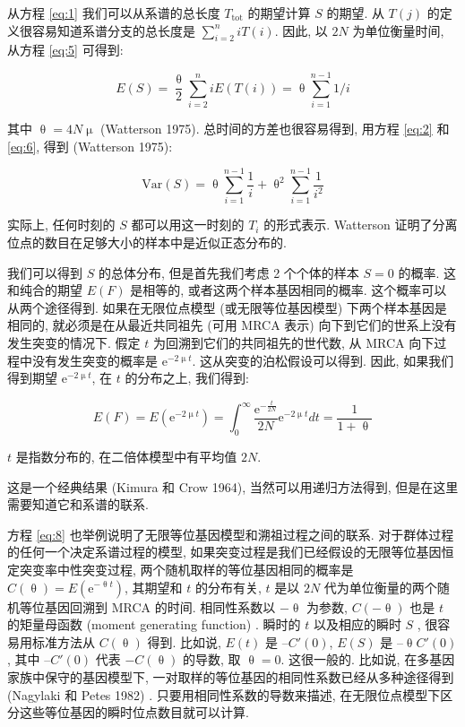 \documentclass[
    12pt,%
    ]{article}
\begin{document}
从方程 \ref{eq:1} 我们可以从系谱的总长度 $T_{\text{tot}}$ 的期望计算 $S$ 的期望. 从 $T(j)$
的定义很容易知道系谱分支的总长度是 $\sum_{i=2}^{n} i T(i)$. 因此, 以 $2N$ 为单位衡量时间, 从方程
\ref{eq:5} 可得到:

\begin{equation} \label{eq:6}
    E(S)=\frac{\uptheta}{2} \sum_{i=2}^{n} iE(T(i)) = \uptheta \sum_{i=1}^{n-1}1/i
\end{equation}

其中 $\uptheta = 4N \upmu$ (Watterson 1975). 总时间的方差也很容易得到, 用方程 \ref{eq:2} 和 \ref{eq:6}, 得到
(Watterson 1975):

\begin{equation} \label{eq:7}
    \text{Var}(S) = \uptheta \sum_{i=1}^{n-1} \frac{1}{i} + \uptheta^{2} \sum_{i=1}^{n-1} \frac{1}{i^{2}}
\end{equation}

实际上, 任何时刻的 $S$ 都可以用这一时刻的 $T_{i}$ 的形式表示. Watterson
证明了分离位点的数目在足够大小的样本中是近似正态分布的.

我们可以得到 $S$ 的总体分布, 但是首先我们考虑 2 个个体的样本 $S=0$ 的概率. 这和纯合的期望 $E(F)$ 是相等的,
或者这两个样本基因相同的概率. 这个概率可以从两个途径得到. 如果在无限位点模型 (或无限等位基因模型) 下两个样本基因是相同的,
就必须是在从最近共同祖先 (可用 MRCA 表示) 向下到它们的世系上没有发生突变的情况下. 假定 $t$
为回溯到它们的共同祖先的世代数, 从 MRCA 向下过程中没有发生突变的概率是 $\mathrm{e}^{-2\upmu t}$.
这从突变的泊松假设可以得到. 因此, 如果我们得到期望 $\mathrm{e}^{-2\upmu t}$, 在 $t$ 的分布之上, 我们得到:

\begin{equation} \label{eq:8}
    E(F) = E(\mathrm{e}^{-2\upmu t}) = \int_{0}^{\infty} \frac{\mathrm{e}^{-\frac{t}{2N}}}{2N}\mathrm{e}^{-2\upmu t} dt = \frac{1}{1+\uptheta}
\end{equation}

$t$ 是指数分布的, 在二倍体模型中有平均值 $2N$.

这是一个经典结果 (Kimura 和 Crow 1964), 当然可以用递归方法得到, 但是在这里需要知道它和系谱的联系.

方程 \ref{eq:8} 也举例说明了无限等位基因模型和溯祖过程之间的联系. 对于群体过程的任何一个决定系谱过程的模型,
如果突变过程是我们已经假设的无限等位基因恒定突变率中性突变过程, 两个随机取样的等位基因相同的概率是 $C(\uptheta
)=E(\mathrm{e}^{-\uptheta t})$, 其期望和 $t$ 的分布有关, $t$ 是以 $2N$ 代为单位衡量的两个随机等位基因回溯到 MRCA
的时间. 相同性系数以 $-\uptheta$ 为参数, $C(-\uptheta )$ 也是 $t$ 的矩量母函数 (moment generating function) .
瞬时的 $t$ 以及相应的瞬时 $S$ , 很容易用标准方法从 $C(\uptheta )$ 得到. 比如说, $E(t)$ 是 $–C'(0)$, $E(S)$ 是
$–\uptheta C'(0)$, 其中 $–C'(0)$ 代表 $-C(\uptheta )$ 的导数, 取 $\uptheta = 0$. 这很一般的. 比如说,
在多基因家族中保守的基因模型下, 一对取样的等位基因的相同性系数已经从多种途径得到 (Nagylaki 和 Petes 1982) .
只要用相同性系数的导数来描述, 在无限位点模型下区分这些等位基因的瞬时位点数目就可以计算.
\end{document}
